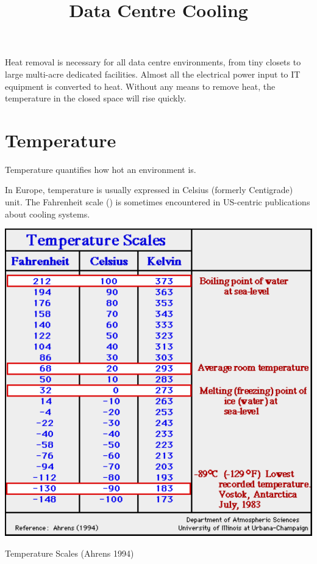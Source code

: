 \documentclass{pgnotes}
\title{Data Centre Cooling}
\begin{document}
\maketitle

\tableofcontents

\newpage


Heat removal is necessary for all data centre environments, from tiny closets to large multi-acre dedicated facilities.
Almost all the electrical power input to IT equipment is converted to heat.
Without any means to remove heat, the temperature in the closed space will rise quickly.

\section{Temperature}

Temperature quantifies how hot an environment is.

In Europe, temperature is usually expressed in Celsius (formerly Centigrade) unit.
The Fahrenheit scale (\si{\fahrenheit}) is sometimes encountered in US-centric publications about cooling systems.

\begin{table}[htbp]
  \centering
  \includegraphics[width=1.0\linewidth]{temp_scales_ahrens}
  \caption{Temperature Scales (Ahrens 1994)}
  \label{tab:temp-scales}
\end{table}
\end{document}
